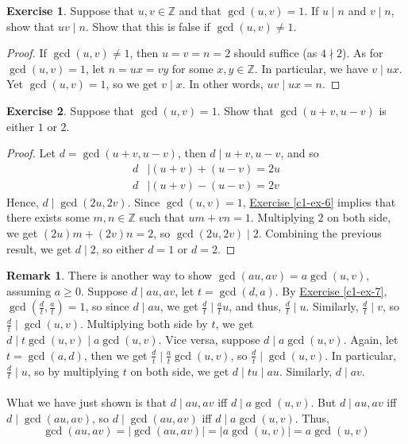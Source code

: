 \documentclass{article}
\theoremstyle{definition}
\newtheorem{exercise}{Exercise}
\newtheorem{remark}{Remark}[exercise]
\begin{document}
\newpage

\begin{exercise} \label{c1-ex-9}
Suppose that $u, v \in \mathbb{Z}$ and that $\gcd(u, v) = 1$. If $u \mid n$ and $v \mid n$, show that $uv \mid n$. Show that this is false if $\gcd(u, v) \neq 1$.
\end{exercise}
\begin{proof}
If $\gcd(u, v) \neq 1$, then $u = v = n = 2$ should suffice (as $4 \nmid 2$). As for $\gcd(u, v) = 1$, let $n = ux = vy$ for some $x, y \in \mathbb{Z}$. In particular, we have $v \mid ux$. Yet $\gcd(u, v) = 1$, so we get $v \mid x$. In other words, $uv \mid ux = n$.
\end{proof}

\newpage

\begin{exercise} \label{c1-ex-10}
Suppose that $\gcd(u, v) = 1$. Show that $\gcd(u + v, u - v)$ is either $1$ or $2$.
\end{exercise}
\begin{proof}
Let $d = \gcd(u + v, u - v)$, then $d \mid u + v, u - v$, and so
\begin{align*}
d & \mid (u + v) + (u - v) = 2u \\
d & \mid (u + v) - (u - v) = 2v
\end{align*}
Hence, $d \mid \gcd(2u, 2v)$. Since $\gcd(u, v) = 1$, \hyperref[c1-ex-6]{Exercise \ref*{c1-ex-6}} implies that there exists some $m, n \in \mathbb{Z}$ such that $um + vn = 1$. Multiplying $2$ on both side, we get $(2u)m + (2v)n = 2$, so $\gcd(2u, 2v) \mid 2$. Combining the previous result, we get $d \mid 2$, so either $d = 1$ or $d = 2$.
\end{proof}
\begin{remark}
There is another way to show $\gcd(au, av) = a \gcd(u, v)$, assuming $a \geq 0$. Suppose $d \mid au, av$, let $t = \gcd(d, a)$. By \hyperref[c1-ex-7]{Exercise \ref*{c1-ex-7}}, $\gcd \left( \frac{d}{t}, \frac{a}{t} \right) = 1$, so since $d \mid au$, we get $\frac{d}{t} \mid \frac{a}{t} u$, and thus, $\frac{d}{t} \mid u$. Similarly, $\frac{d}{t} \mid v$, so $\frac{d}{t} \mid \gcd(u, v)$. Multiplying both side by $t$, we get $d \mid t \gcd(u, v) \mid a \gcd(u, v)$. Vice versa, suppose $d \mid a \gcd(u, v)$. Again, let $t = \gcd(a, d)$, then we get $\frac{d}{t} \mid \frac{a}{t} \gcd(u, v)$, so $\frac{d}{t} \mid \gcd(u, v)$. In particular, $\frac{d}{t} \mid u$, so by multiplying $t$ on both side, we get $d \mid tu \mid au$. Similarly, $d \mid av$.
\\
\\
What we have just shown is that $d \mid au, av$ iff $d \mid a \gcd(u, v)$. But $d \mid au, av$ iff $d \mid \gcd(au, av)$, so $d \mid \gcd(au, av)$ iff $d \mid a \gcd(u, v)$. Thus,
$$\gcd(au, av) = |\gcd(au, av)| = |a \gcd(u, v)| = a \gcd (u, v)$$
\end{remark}
\end{document}
